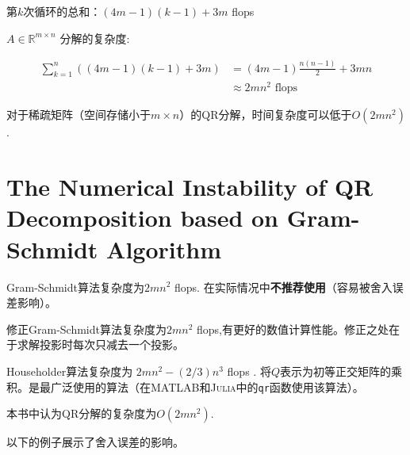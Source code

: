 第$k$次循环的总和：$(4m-1)(k-1)+3m$ flops

$ A \in \mathbb{R}^{m \times n} $ 分解的复杂度:

\begin{equation} \begin{aligned} \sum_{k=1}^{n}((4 m-1)(k-1)+3 m) &=(4 m-1) \frac{n(n-1)}{2}+3 m n \\ & \approx 2 m n^{2} \text { flops } \end{aligned} \end{equation}

对于稀疏矩阵（空间存储小于$m \times n$）的QR分解，时间复杂度可以低于$O(2mn^2)$. 



\section{The Numerical Instability of QR Decomposition based on Gram-Schmidt Algorithm}

Gram-Schmidt算法复杂度为$2mn^2$ flops. 在实际情况中\textbf{不推荐使用}（容易被舍入误差影响）。

修正Gram-Schmidt算法复杂度为$2mn^2$ flops,有更好的数值计算性能。修正之处在于求解投影时每次只减去一个投影。

Householder算法复杂度为 $ 2 m n^{2}-(2 / 3) n^{3} $ flops .
将$Q$表示为初等正交矩阵的乘积。是最广泛使用的算法（在\textsc{MATLAB}和\textsc{Julia}中的\verb|qr|函数使用该算法）。

本书中认为QR分解的复杂度为$O(2mn^2)$.

以下的例子展示了舍入误差的影响。

